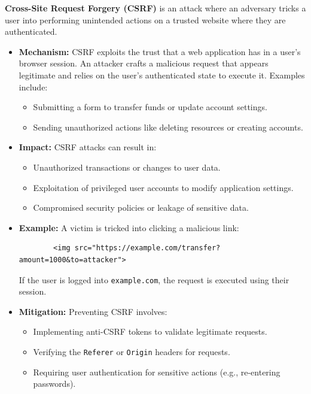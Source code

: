 \begin{theo}

    \label{theo:csrf}
    \textbf{Cross-Site Request Forgery (CSRF)} is an attack where an adversary tricks a user into performing unintended actions on a trusted website where they are authenticated.
    
    \begin{itemize}
        \item \textbf{Mechanism:}
        CSRF exploits the trust that a web application has in a user's browser session. An attacker crafts a malicious request that appears legitimate and relies on the user's authenticated state to execute it. Examples include:
        \begin{itemize}
            \item Submitting a form to transfer funds or update account settings.
            \item Sending unauthorized actions like deleting resources or creating accounts.
        \end{itemize}
    
        \item \textbf{Impact:}
        CSRF attacks can result in:
        \begin{itemize}
            \item Unauthorized transactions or changes to user data.
            \item Exploitation of privileged user accounts to modify application settings.
            \item Compromised security policies or leakage of sensitive data.
        \end{itemize}
    
        \item \textbf{Example:}
        A victim is tricked into clicking a malicious link:
        \begin{verbatim}
        <img src="https://example.com/transfer?amount=1000&to=attacker">
        \end{verbatim}
        If the user is logged into \texttt{example.com}, the request is executed using their session.
    
        \item \textbf{Mitigation:}
        Preventing CSRF involves:
        \begin{itemize}
            \item Implementing anti-CSRF tokens to validate legitimate requests.
            \item Verifying the \texttt{Referer} or \texttt{Origin} headers for requests.
            \item Requiring user authentication for sensitive actions (e.g., re-entering passwords).
        \end{itemize}
    \end{itemize}
\end{theo}
